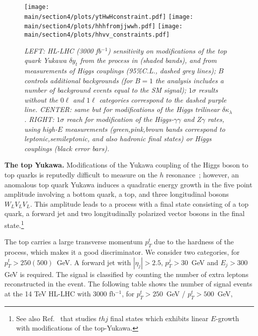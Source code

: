 \begin{figure}[t]
\begin{center}
\texttt{[image: \\main/section4/plots/ytHwHconstraint.pdf]}
\texttt{[image: \\main/section4/plots/hhhfromjjwwh.pdf]}
\texttt{[image: \\main/section4/plots/hhvv\_constraints.pdf]}
\end{center}
     \caption{\footnotesize \emph{LEFT: HL-LHC (3000 fb$^{-1}$) sensitivity on modifications of the top quark Yukawa $\delta y_t$ from the process in  (shaded bands), and from measurements of Higgs couplings (95\%C.L., dashed grey lines); $B$ controls additional backgrounds (for $B=1$ the analysis includes a number of background events equal to the SM signal); $1\sigma$ results without the $0\ell$ and $1\ell$ categories correspond to the dashed purple line. CENTER: same but for modifications of the Higgs trilinear $\delta\kappa_\lambda$. RIGHT: $1\sigma$ reach for modification of the Higgs-$\gamma\gamma$ and $Z\gamma$ rates, using high-$E$ measurements (green,pink,brown bands correspond to leptonic,semileptonic, and also hadronic final states)  or Higgs couplings (black error bars). 
}}\label{fig:reach}
\end{figure} 




\vspace{5mm}
\noindent
{\bf The top Yukawa.}
Modifications of the Yukawa coupling of the Higgs boson to top quarks is reputedly difficult to measure on the $h$ resonance~\cite{Aaboud:2018urx}; however, an anomalous top quark Yukawa induces a quadratic energy growth in the five point amplitude involving a bottom quark, a top, and three longitudinal bosons $W_LV_LV_L$. This amplitude leads to a process with a final state consisting of a top quark, a forward jet and two longitudinally polarized vector bosons in the final state.\footnote{See also Ref.~\cite{Degrande:2018fog} that  studies $thj$ final states which exhibits linear $E$-growth with modifications of the top-Yukawa.}

 The top carries a large transverse momentum $p_T^t$ due to the hardness of the process, which makes it a good discriminator. We consider two categories, for $p_T^t>250(500)$~GeV. A forward jet with $|\eta_j|>2.5$, $p_T^j>30$~GeV and $E_j>300$ GeV is required. The signal is classified by  counting the number of extra leptons reconstructed in the event. The following table shows the number of signal events  at the 14 TeV HL-LHC  with 3000 fb$^{-1}$, for $p_T^t>250$~GeV / $p_T^t>500$~GeV,
  

